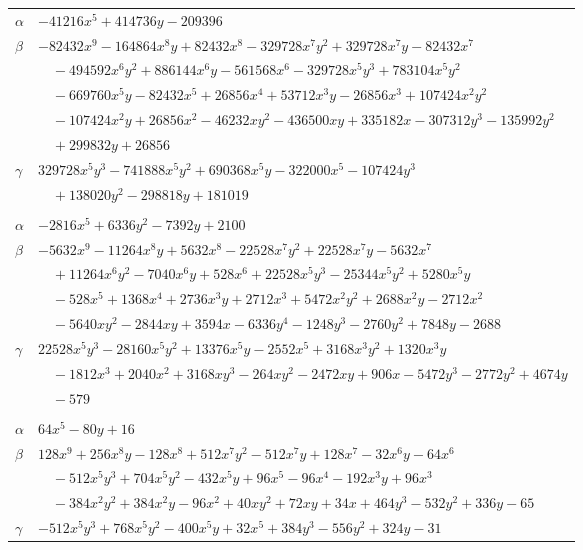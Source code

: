 \documentclass[11pt]{article}
\begin{document}
\begin{longtable}{@{}ll@{}}
$\alpha$ & $-41216x^{5}+414736y-209396$\\
$\beta$ & $-82432x^{9}-164864x^{8}y+82432x^{8}-329728x^{7}y^{2}+329728x^{7}y-82432x^{7}$\\
 & $\quad -494592x^{6}y^{2}+886144x^{6}y-561568x^{6}-329728x^{5}y^{3}+783104x^{5}y^{2}$\\
 & $\quad -669760x^{5}y-82432x^{5}+26856x^{4}+53712x^{3}y-26856x^{3}+107424x^{2}y^{2}$\\
 & $\quad -107424x^{2}y+26856x^{2}-46232xy^{2}-436500xy+335182x-307312y^{3}-135992y^{2}$\\
 & $\quad +299832y+26856$\\
$\gamma$ & $329728x^{5}y^{3}-741888x^{5}y^{2}+690368x^{5}y-322000x^{5}-107424y^{3}$\\
 & $\quad +138020y^{2}-298818y+181019$\\
\addlinespace[3pt]
\multicolumn{2}{@{}l}{$\{i,j\}=\{6,38\}$, $k_{ij}=3^{2}$}\\
$\alpha$ & $-2816x^{5}+6336y^{2}-7392y+2100$\\
$\beta$ & $-5632x^{9}-11264x^{8}y+5632x^{8}-22528x^{7}y^{2}+22528x^{7}y-5632x^{7}$\\
 & $\quad +11264x^{6}y^{2}-7040x^{6}y+528x^{6}+22528x^{5}y^{3}-25344x^{5}y^{2}+5280x^{5}y$\\
 & $\quad -528x^{5}+1368x^{4}+2736x^{3}y+2712x^{3}+5472x^{2}y^{2}+2688x^{2}y-2712x^{2}$\\
 & $\quad -5640xy^{2}-2844xy+3594x-6336y^{4}-1248y^{3}-2760y^{2}+7848y-2688$\\
$\gamma$ & $22528x^{5}y^{3}-28160x^{5}y^{2}+13376x^{5}y-2552x^{5}+3168x^{3}y^{2}+1320x^{3}y$\\
 & $\quad -1812x^{3}+2040x^{2}+3168xy^{3}-264xy^{2}-2472xy+906x-5472y^{3}-2772y^{2}+4674y$\\
 & $\quad -579$\\
\addlinespace[3pt]
\multicolumn{2}{@{}l}{$\{i,j\}=\{6,39\}$, $k_{ij}=2\cdot 3^{2}$}\\
$\alpha$ & $64x^{5}-80y+16$\\
$\beta$ & $128x^{9}+256x^{8}y-128x^{8}+512x^{7}y^{2}-512x^{7}y+128x^{7}-32x^{6}y-64x^{6}$\\
 & $\quad -512x^{5}y^{3}+704x^{5}y^{2}-432x^{5}y+96x^{5}-96x^{4}-192x^{3}y+96x^{3}$\\
 & $\quad -384x^{2}y^{2}+384x^{2}y-96x^{2}+40xy^{2}+72xy+34x+464y^{3}-532y^{2}+336y-65$\\
$\gamma$ & $-512x^{5}y^{3}+768x^{5}y^{2}-400x^{5}y+32x^{5}+384y^{3}-556y^{2}+324y-31$\\

\end{longtable}
\end{document}
